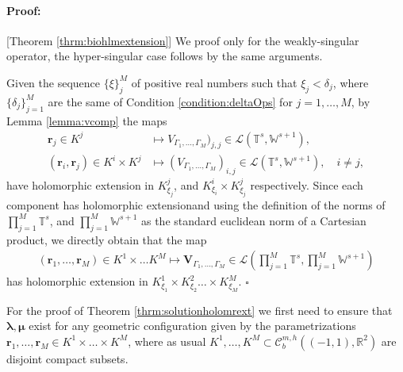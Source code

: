 \documentclass{article}
\newenvironment{proof}{\paragraph{Proof:}}{\hfill$\square$}
\newcommand{\bmu} {\bm{\mu}}
\newcommand{\IR}{{\mathbb R}}
\newcommand{\IT}{{\mathbb T}}
\newcommand{\IW}{{\mathbb W}}
\newcommand{\rgeoh}[2]{\mathcal{C}_b^{#1,#2}\left( (-1,1), \IR^2 \right)}
\newcommand{\bla}{\boldsymbol \lambda}
\newcommand{\br}{\bm{r}}
\begin{document}
\begin{proof}[Theorem \ref{thrm:biohlmextension}]
We proof only for the weakly-singular operator, the hyper-singular case follows by the same arguments. 

Given the sequence $\{\xi\}_j^M$ of positive real numbers such that $\xi_j < \delta_j$, where $\{\delta_j\}_{j=1}^M$ are the same of Condition \ref{condition:deltaOps} for $j=1,\hdots,M$, by Lemma \ref{lemma:vcomp} the maps  
\begin{align*}
\br_j \in K^j &\mapsto V_{\Gamma_1,\hdots,\Gamma_M})_{j,j} \in \mathcal{L}\left( \IT^s,\IW^{s+1}\right), \\
(\br_i,\br_j) \in K^i \times K^j &\mapsto (V_{\Gamma_1,\hdots,\Gamma_M})_{i,j} \in \mathcal{L}\left( \IT^s,\IW^{s+1}\right), \quad i \neq j,
\end{align*}
have holomorphic extension in $K^j_{\xi_j}$, and $K^i_{\xi_i} \times K^j_{\xi_j}$ respectively. Since each component has holomorphic extensionand using the definition of the norms of $  \prod_{j=1}^M \IT^s$, and  $\prod_{j=1}^M \IW^{s+1}$ as the standard euclidean norm of a Cartesian product, we directly obtain that the map 
\begin{align*}
(\br_1,\hdots,\br_M) \in K^1 \times \hdots K^M \mapsto \mathbf{V}_{\Gamma_1, \hdots,\Gamma_M} \in \mathcal{L} \left(  \prod_{j=1}^M \IT^s, \prod_{j=1}^M \IW^{s+1}
\right)
\end{align*}
has holomorphic extension in $K^1_{\xi_1} \times K^2_{\xi_2} \hdots \times K^M_{\xi_M}$.
\end{proof}

For the proof of Theorem \ref{thrm:solutionholomrext} we first need to ensure that $\bla, \bmu$ exist for any geometric configuration given by the parametrizations $\br_1,\hdots,\br_M \in K^1\times \hdots \times K^M$, where as usual $K^1,\hdots ,K^M \subset \rgeoh{m}{h}$ are disjoint compact subsets.
\end{document}
